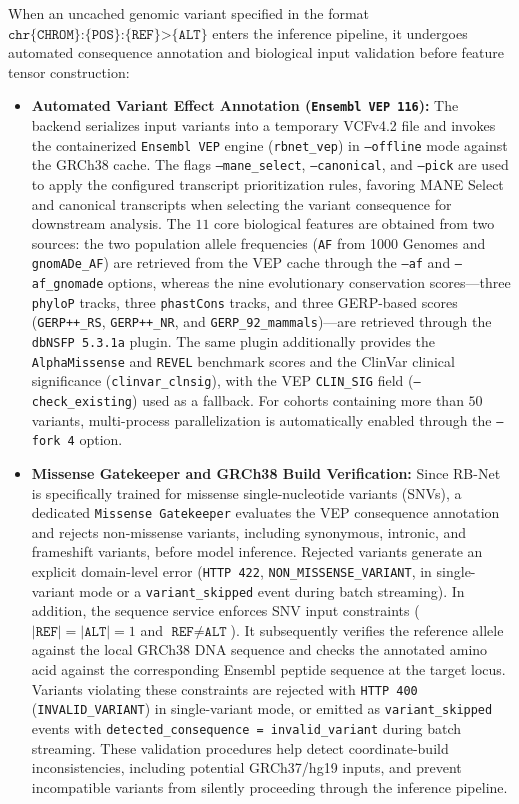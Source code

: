 When an uncached genomic variant specified in the format $\texttt{chr\{CHROM\}:\{POS\}:\{REF\}>\{ALT\}}$ enters the inference pipeline, it undergoes automated consequence annotation and biological input validation before feature tensor construction:

\begin{itemize}
    \item \textbf{Automated Variant Effect Annotation (\texttt{Ensembl VEP 116}):} The backend serializes input variants into a temporary VCFv4.2 file and invokes the containerized \texttt{Ensembl VEP} engine (\texttt{rbnet\_vep}) in \texttt{--offline} mode against the GRCh38 cache. The flags \texttt{--mane\_select}, \texttt{--canonical}, and \texttt{--pick} are used to apply the configured transcript prioritization rules, favoring MANE Select and canonical transcripts when selecting the variant consequence for downstream analysis. The $11$ core biological features are obtained from two sources: the two population allele frequencies (\texttt{AF} from 1000 Genomes and \texttt{gnomADe\_AF}) are retrieved from the VEP cache through the \texttt{--af} and \texttt{--af\_gnomade} options, whereas the nine evolutionary conservation scores---three \texttt{phyloP} tracks, three \texttt{phastCons} tracks, and three GERP-based scores (\texttt{GERP++\_RS}, \texttt{GERP++\_NR}, and \texttt{GERP\_92\_mammals})---are retrieved through the \texttt{dbNSFP 5.3.1a} plugin. The same plugin additionally provides the \texttt{AlphaMissense} and \texttt{REVEL} benchmark scores and the ClinVar clinical significance (\texttt{clinvar\_clnsig}), with the VEP \texttt{CLIN\_SIG} field (\texttt{--check\_existing}) used as a fallback. For cohorts containing more than $50$ variants, multi-process parallelization is automatically enabled through the \texttt{--fork 4} option.

    \item \textbf{Missense Gatekeeper and GRCh38 Build Verification:} Since RB-Net is specifically trained for missense single-nucleotide variants (SNVs), a dedicated \texttt{Missense Gatekeeper} evaluates the VEP consequence annotation and rejects non-missense variants, including synonymous, intronic, and frameshift variants, before model inference. Rejected variants generate an explicit domain-level error (\texttt{HTTP 422}, \texttt{NON\_MISSENSE\_VARIANT}, in single-variant mode or a \texttt{variant\_skipped} event during batch streaming). In addition, the sequence service enforces SNV input constraints ($|\texttt{REF}| = |\texttt{ALT}| = 1$ and $\texttt{REF} \neq \texttt{ALT}$). It subsequently verifies the reference allele against the local GRCh38 DNA sequence and checks the annotated amino acid against the corresponding Ensembl peptide sequence at the target locus. Variants violating these constraints are rejected with \texttt{HTTP 400} (\texttt{INVALID\_VARIANT}) in single-variant mode, or emitted as \texttt{variant\_skipped} events with \texttt{detected\_consequence = invalid\_variant} during batch streaming. These validation procedures help detect coordinate-build inconsistencies, including potential GRCh37/hg19 inputs, and prevent incompatible variants from silently proceeding through the inference pipeline.


\end{itemize}
